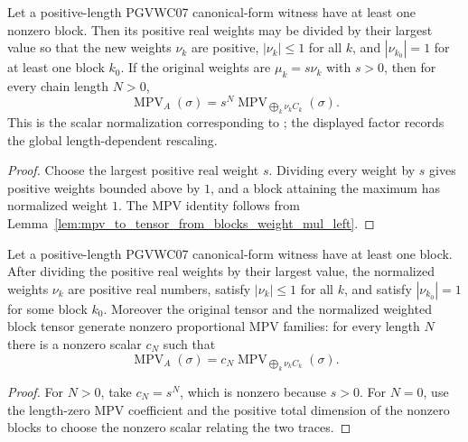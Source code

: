 \begin{theorem}%
    \label{thm:pgvwc07_positive_length_witness_weight_normalization}
    \leanok
    Let a positive-length PGVWC07 canonical-form witness have at least one
    nonzero block. Then its positive real weights may be divided by their
    largest value so that the new weights $\nu_k$ are positive,
    $|\nu_k|\leq 1$ for all $k$, and $|\nu_{k_0}|=1$ for at least one
    block $k_0$. If the original weights are $\mu_k=s\nu_k$ with
    $s>0$, then for every chain length $N>0$,
    \[
        \operatorname{MPV}_A(\sigma)
        =
        s^N
        \operatorname{MPV}_{\bigoplus_k \nu_k C_k}(\sigma).
    \]
    This is the scalar normalization corresponding to
    \cite[Theorem~Th:TIcanonical]{PerezGarcia2007Matrix}; the displayed factor
    records the global length-dependent rescaling.
\end{theorem}
\begin{proof}\leanok
    Choose the largest positive real weight $s$. Dividing every weight by
    $s$ gives positive weights bounded above by $1$, and a block attaining
    the maximum has normalized weight $1$. The MPV identity follows from
    Lemma~\ref{lem:mpv_to_tensor_from_blocks_weight_mul_left}.
\end{proof}

\begin{theorem}%
    \label{thm:pgvwc07_positive_length_witness_weight_normalization_projective}
    \leanok
    Let a positive-length PGVWC07 canonical-form witness have at least one
    block. After dividing the positive real weights by their largest value,
    the normalized weights $\nu_k$ are positive real numbers, satisfy
    $|\nu_k|\leq 1$ for all $k$, and satisfy $|\nu_{k_0}|=1$ for some block
    $k_0$. Moreover the original tensor and the normalized
    weighted block tensor generate nonzero proportional MPV families:
    for every length $N$ there is a nonzero scalar $c_N$ such that
    \[
        \operatorname{MPV}_A(\sigma)
        =
        c_N
        \operatorname{MPV}_{\bigoplus_k \nu_k C_k}(\sigma).
    \]
\end{theorem}
\begin{proof}\leanok
    For $N>0$, take $c_N=s^N$, which is nonzero because $s>0$. For
    $N=0$, use the length-zero MPV coefficient and the positive total
    dimension of the nonzero blocks to choose the nonzero scalar relating the
    two traces.
\end{proof}

